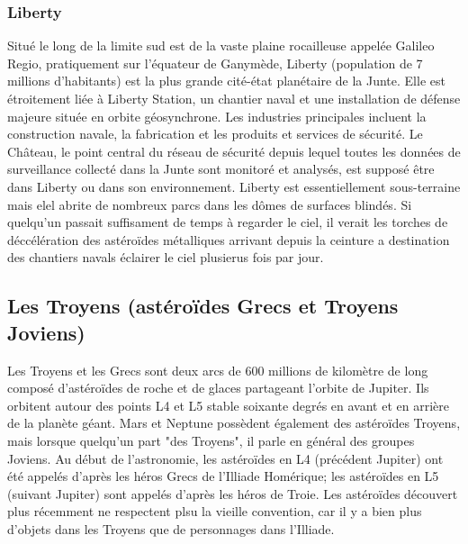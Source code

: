                                                                \subsubsection{Liberty} \label{sec:liberty} 

                                                               Situé le long de la limite sud est de la vaste plaine rocailleuse appelée Galileo Regio, pratiquement sur l'équateur de Ganymède, Liberty (population de 7 millions d'habitants) est la plus grande cité-état planétaire de la Junte. Elle est étroitement liée à Liberty Station, un chantier naval et une installation de défense majeure située en orbite géosynchrone. Les industries principales incluent la construction navale, la fabrication et les produits et services de sécurité. Le Château, le point central du réseau de sécurité depuis lequel toutes les données de surveillance collecté dans la Junte sont monitoré et analysés, est supposé être dans Liberty ou dans son environnement. Liberty est essentiellement sous-terraine mais elel abrite de nombreux parcs dans les dômes de surfaces blindés. Si quelqu'un passait suffisament de temps à regarder le ciel, il verait les torches de déccélération des astéroïdes métalliques arrivant depuis la ceinture a destination des chantiers navals éclairer le ciel plusierus fois par jour. 

                                                               \subsection{Les Troyens (astéroïdes Grecs et Troyens Joviens)} \label{sec:troj-jovi-troj} 

                                                               Les Troyens et les Grecs sont deux arcs de 600 millions de kilomètre de long composé d'astéroïdes de roche et de glaces partageant l'orbite de Jupiter. Ils orbitent autour des points L4 et L5 stable soixante degrés en avant et en arrière de la planète géant. Mars et Neptune possèdent également des astéroïdes Troyens, mais lorsque quelqu'un part "des Troyens", il parle en général des groupes Joviens. Au début de l'astronomie, les astéroïdes en L4 (précédent Jupiter) ont été appelés d'après les héros Grecs de l'Illiade Homérique; les astéroïdes en L5 (suivant Jupiter) sont appelés d'après les héros de Troie. Les astéroïdes découvert plus récemment ne respectent plsu la vieille convention, car il y a bien plus d'objets dans les Troyens que de personnages dans l'Illiade. 

